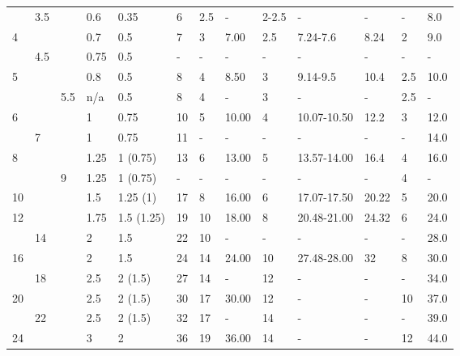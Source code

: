 \begin{table}[h!]
\begin{longtable}{lll|ll|lllllll|l}
        &3.5 &    &0.6     &0.35       &6         &2.5    &-      &2-2.5  &-           &-         &-    &8.0   \\
    4   &    &    &0.7     &0.5        &7         &3      &7.00   &2.5    &7.24-7.6    &8.24      &2    &9.0   \\
        &4.5 &    &0.75    &0.5        &-         &-      &-      &-      &-           &-         &-    &-     \\
    5   &    &    &0.8     &0.5        &8         &4      &8.50   &3      &9.14-9.5    &10.4      &2.5  &10.0  \\
        &    &5.5 &n/a     &0.5        &8         &4      &-      &3      &-           &-         &2.5  &-     \\
    6   &    &    &1       &0.75       &10        &5      &10.00  &4      &10.07-10.50 &12.2      &3    &12.0  \\
        &7   &    &1       &0.75       &11        &-      &-      &-      &-           &-         &-    &14.0  \\
    8   &    &    &1.25    &1 (0.75)   &13        &6      &13.00  &5      &13.57-14.00 &16.4      &4    &16.0  \\
        &    &9   &1.25    &1 (0.75)   &-         &-      &-      &-      &-           &-         &4    &-     \\
    10  &    &    &1.5     &1.25 (1)   &17        &8      &16.00  &6      &17.07-17.50 &20.22     &5    &20.0  \\
    12  &    &    &1.75    &1.5 (1.25) &19        &10     &18.00  &8      &20.48-21.00 &24.32     &6    &24.0  \\
        &14  &    &2       &1.5        &22        &10     &-      &-      &-           &-         &-    &28.0  \\
    16  &    &    &2       &1.5        &24        &14     &24.00  &10     &27.48-28.00 &32        &8    &30.0  \\
        &18  &    &2.5     &2 (1.5)    &27        &14     &-      &12     &-           &-         &-    &34.0  \\
    20  &    &    &2.5     &2 (1.5)    &30        &17     &30.00  &12     &-           &-         &10   &37.0  \\
        &22  &    &2.5     &2 (1.5)    &32        &17     &-      &14     &-           &-         &-    &39.0  \\
    24  &    &    &3       &2          &36        &19     &36.00  &14     &-           &-         &12   &44.0  \\

\end{longtable}
\end{table}

